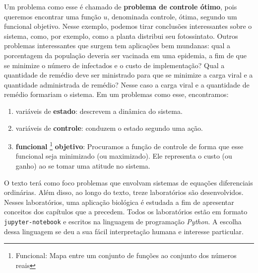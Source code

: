 Um problema como esse é chamado de \textbf{problema de controle ótimo}, pois
queremos encontrar uma função $u$, denominada controle, ótima, segundo um
funcional objetivo. Nesse exemplo, podemos tirar conclusões interessantes
sobre o sistema, como, por exemplo, como a planta distribui seu fotossintato.
Outros problemas interessantes que surgem tem aplicações bem mundanas: qual a
porcentagem da população deveria ser vacinada em uma epidemia, a fim de que se
minimize o número de infectados e o custo de implementação? Qual a quantidade
de remédio deve ser ministrado para que se minimize a carga viral e a
quantidade administrada de remédio? Nesse caso a carga viral e a quantidade de
remédio formariam o sistema.  
Em um problemas como esse, encontramos: 
\begin{enumerate}
    \item variáveis de \textbf{estado}: descrevem a dinâmica do sistema. 
    \item variáveis de \textbf{controle}: conduzem o estado segundo uma ação. 
    \item \textbf{funcional} \footnote{Funcional: Mapa entre um conjunto de funções ao
    conjunto dos números reais} \textbf{objetivo}: Procuramos a função de
    controle de forma que esse funcional seja minimizado (ou maximizado). Ele
    representa o custo (ou ganho) ao se tomar uma atitude no sistema. 
\end{enumerate}

O texto terá como foco problemas que envolvam sistemas de equações
diferenciais ordinárias. Além disso, ao longo do texto, treze laboratórios são
desenvolvidos. Nesses laboratórios, uma aplicação biológica é estudada a fim
de apresentar conceitos dos capítulos que a precedem. Todos os laboratórios
estão em formato \texttt{jupyter-notebook} e escritos na linguagem de
programação \textit{Python}. A escolha dessa linguagem se deu a sua fácil
interpretação humana e interesse particular.  
